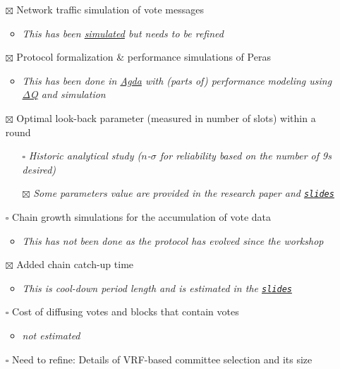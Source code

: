 \documentclass[10pt]{article}
\providecommand{\tightlist}{%
  \setlength{\itemsep}{0pt}\setlength{\parskip}{0pt}}
\begin{document}
\begin{itemize}
\tightlist
\item[$\boxtimes$]
  Network traffic simulation of vote messages

  \begin{itemize}
  \tightlist
  \item
    \emph{This has been \hyperref[simulations]{simulated} but needs to
    be refined}
  \end{itemize}
\item[$\boxtimes$]
  Protocol formalization \& performance simulations of Peras

  \begin{itemize}
  \tightlist
  \item
    \emph{This has been done in \hyperref[agda-specification]{Agda} with
    (parts of) performance modeling using
    \hyperref[network-performance-analysis]{ΔQ} and simulation}
  \end{itemize}
\item[$\boxtimes$]
  Optimal look-back parameter (measured in number of slots) within a
  round

  \begin{itemize}
  \tightlist
  \item[$\square$]
    \emph{Historic analytical study (\(n\)-\(\sigma\) for reliability
    based on the number of 9s desired)}
  \item[$\boxtimes$]
    \emph{Some parameters value are provided in the research paper and
    \href{https://docs.google.com/presentation/d/1QGCvDoOJIWug8jJgCNv3p9BZV-R8UZCyvosgNmN-lJU/edit\#slide=id.g2ca1209fec0_0_450}{\color{blue}\texttt{slides}}}
  \end{itemize}
\item[$\square$]
  Chain growth simulations for the accumulation of vote data

  \begin{itemize}
  \tightlist
  \item
    \emph{This has not been done as the protocol has evolved since the
    workshop}
  \end{itemize}
\item[$\boxtimes$]
  Added chain catch-up time

  \begin{itemize}
  \tightlist
  \item
    \emph{This is cool-down period length and is estimated in the
    \href{https://docs.google.com/presentation/d/1QGCvDoOJIWug8jJgCNv3p9BZV-R8UZCyvosgNmN-lJU/edit\#slide=id.g2ca1209fec0_0_450}{\color{blue}\texttt{slides}}}
  \end{itemize}
\item[$\square$]
  Cost of diffusing votes and blocks that contain votes

  \begin{itemize}
  \tightlist
  \item
    \emph{not estimated}
  \end{itemize}
\item[$\square$]
  Need to refine: Details of VRF-based committee selection and its size
\end{itemize}
\end{document}
